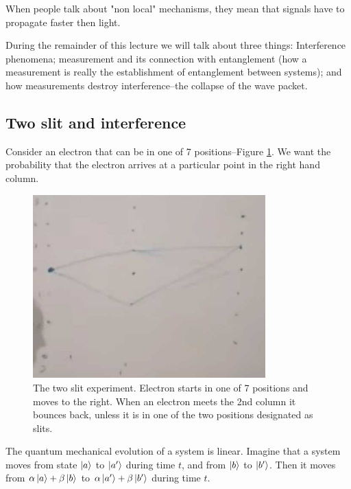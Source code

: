 \documentclass[]{article}
\begin{document}
When people talk about "non local" mechanisms, they mean that signals have to propagate faster then light.

During the remainder of this lecture we will talk about three things: Interference phenomena; measurement and its connection with entanglement (how a measurement is really the establishment of entanglement between systems); and how measurements destroy interference--the collapse of the wave packet.

\subsection{Two slit and interference} 

Consider an electron that can be in one of 7 positions--Figure \ref{fig:ent-2-slit}. We want the probability that the electron arrives at a particular point in the right hand column.

\begin{figure}[H]
	\begin{center}
		\caption[Two slit experiment]{The two slit experiment. Electron starts in one of 7 positions and moves to the right. When an electron meets the 2nd column it bounces back, unless it is in one of the two positions designated as slits.}\label{fig:ent-2-slit}
		\includegraphics[width=0.8\textwidth]{ent-2-slit}
	\end{center}
\end{figure}
The quantum mechanical evolution of a system is linear. Imagine that a system moves from state $\ket{a}$ to $\ket{a^{\prime}}$ during time $t$, and from  $\ket{b}$ to $\ket{b^{\prime}}$. Then it moves from $\alpha \ket{a} + \beta \ket{b}$ to $\alpha \ket{a^{\prime}} + \beta \ket{b^{\prime}}$ during time $t$.
\end{document}
